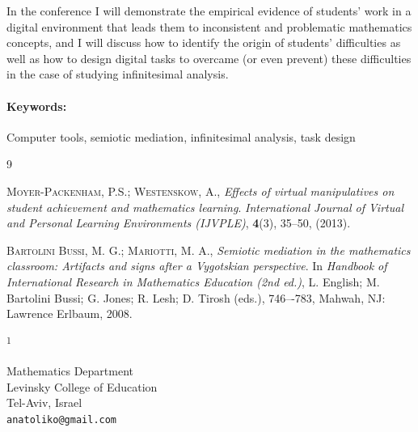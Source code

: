 \documentclass{article}
\newcommand{\ADDRESS}[2]{\noindent
  \textsuperscript{#1}\parbox[t]{0.9\textwidth}{#2} \vspace{6pt}}
\newcommand{\KEYWORDS}[1]{\paragraph{Keywords:} #1}
\begin{document}
In the conference I will demonstrate the empirical evidence of students'
work in a digital environment that leads them to inconsistent and
problematic mathematics concepts, and I will discuss how to identify
the origin of students' difficulties as well as how to design digital
tasks to overcame (or even prevent) these difficulties in the case of
studying infinitesimal analysis.
 


\KEYWORDS {Computer tools, semiotic mediation, infinitesimal analysis, task design }







\begin{thebibliography}{9}

 \textsc{Moyer-Packenham, P.S.; Westenskow, A.},
\emph{Effects of virtual manipulatives on student achievement and mathematics
learning}.
\emph{International Journal of Virtual and Personal Learning Environments
(IJVPLE)}, \textbf{4}(3), 35--50, (2013).

 \textsc{Bartolini Bussi, M. G.; Mariotti, M. A.},
\emph{Semiotic mediation in the mathematics classroom: Artifacts and signs
after a Vygotskian perspective}.
In \emph{Handbook of International Research in Mathematics Education (2nd ed.)},
L. English; M. Bartolini Bussi; G. Jones; R. Lesh; D. Tirosh (eds.),
746–-783, Mahwah, NJ: Lawrence Erlbaum, 2008.




\end{thebibliography}

\vspace{1cm}

\ADDRESS{1}{
 Mathematics Department\\Levinsky College of Education \\
Tel-Aviv, Israel \\
\texttt{anatoliko@gmail.com}
}

%
\end{document}
